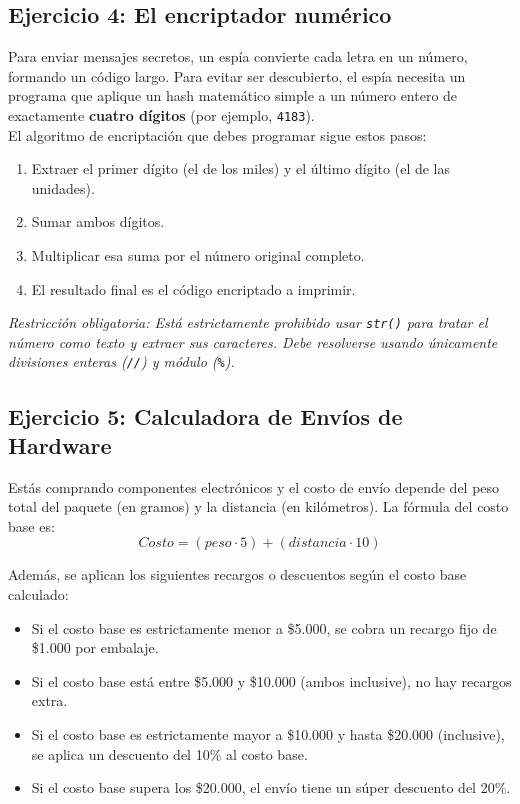 \documentclass[11pt, a4paper]{article}
\begin{document}
	
	\subsection*{Ejercicio 4: El encriptador numérico}
	
	Para enviar mensajes secretos, un espía convierte cada letra en un número, formando un código largo. Para evitar ser descubierto, el espía necesita un programa que aplique un hash matemático simple a un número entero de exactamente \textbf{cuatro dígitos} (por ejemplo, \texttt{4183}). \\
	
	El algoritmo de encriptación que debes programar sigue estos pasos:
	\begin{enumerate}
		\item Extraer el primer dígito (el de los miles) y el último dígito (el de las unidades).
		\item Sumar ambos dígitos.
		\item Multiplicar esa suma por el número original completo.
		\item El resultado final es el código encriptado a imprimir.
	\end{enumerate}
	\textit{Restricción obligatoria: Está estrictamente prohibido usar \texttt{str()} para tratar el número como texto y extraer sus caracteres. Debe resolverse usando únicamente divisiones enteras (\texttt{//}) y módulo (\texttt{\%}).}
	
	
	\subsection*{Ejercicio 5: Calculadora de Envíos de Hardware}
	
	Estás comprando componentes electrónicos y el costo de envío depende del peso total del paquete (en gramos) y la distancia (en kilómetros).
	La fórmula del costo base es: $$Costo = (peso \cdot 5) + (distancia \cdot 10)$$
	
	Además, se aplican los siguientes recargos o descuentos según el costo base calculado:
	\begin{itemize}
		\item Si el costo base es estrictamente menor a \$5.000, se cobra un recargo fijo de \$1.000 por embalaje.
		\item Si el costo base está entre \$5.000 y \$10.000 (ambos inclusive), no hay recargos extra.
		\item Si el costo base es estrictamente mayor a \$10.000 y hasta \$20.000 (inclusive), se aplica un descuento del 10\% al costo base.
		\item Si el costo base supera los \$20.000, el envío tiene un súper descuento del 20\%.
	\end{itemize}
	
\end{document}
